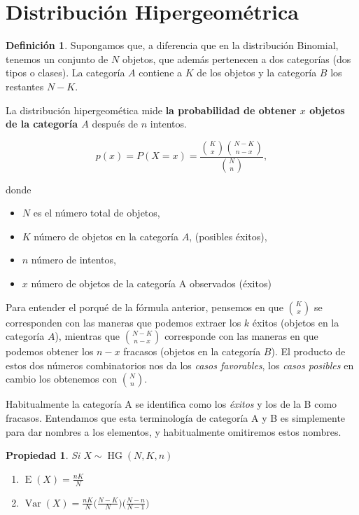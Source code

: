 \documentclass[]{book}
\providecommand{\tightlist}{%
  \setlength{\itemsep}{0pt}\setlength{\parskip}{0pt}}
\theoremstyle{plain}
\newtheorem{property}[theorem]{Propiedad}
\theoremstyle{definition}
\newtheorem{definition}[theorem]{Definición}
\theoremstyle{definition} %
\begin{document}
\section{Distribución Hipergeométrica} 

\begin{definition}
  Supongamos que, a diferencia que en la distribución Binomial, tenemos un
conjunto de \(N\) objetos, que además pertenecen a dos categorías (dos
tipos o clases). La categoría \(A\) contiene a \(K\) de los objetos y la
categoría \(B\) los restantes \(N-K\).

La distribución hipergeomética mide \textbf{la probabilidad de obtener
\(x\) objetos de la categoría \(A\)} después de \(n\) intentos.

\[\displaystyle p(x)=P(X=x)={\frac {{\binom {K}{x}}{\binom {N-K}{n-x}}}{\binom {N}{n}}},\]

donde

\begin{itemize}
\tightlist
\item
  \(N\) es el número total de objetos,
\item
  \(K\) número de objetos en la categoría \(A\), (posibles éxitos),
\item
  \(n\) número de intentos,
\item
  \(x\) número de objetos de la categoría A observados (éxitos)
\end{itemize}

Para entender el porqué de la fórmula anterior, pensemos en que
\({\binom {K}{x}}\) se corresponden con las maneras que podemos extraer
los \(k\) éxitos (objetos en la categoría \(A\)), mientras que
\({\binom {N-K}{n-x}}\) corresponde con las maneras en que podemos
obtener los \(n-x\) fracasos (objetos en la categoría \(B\)). El
producto de estos dos números combinatorios nos da los \emph{casos
favorables}, los \emph{casos posibles} en cambio los obtenemos con
\({\binom {N}{n}}\).

Habitualmente la categoría A se identifica como los \emph{éxitos} y los de la B como fracasos. 
Entendamos que esta terminología de categoría A y B es simplemente para dar nombres a los elementos, y habitualmente omitiremos 
estos nombres.

\end{definition}
 

\begin{property}

  Si \(\displaystyle X\sim \operatorname {HG} (N,K,n)\)  
\begin{enumerate}
  \item $\displaystyle \operatorname {E} (X)={\frac {nK}{N}}$
  \item $\displaystyle \operatorname {Var} (X)={\frac {nK}{N}}{\bigg (}{\frac {N-K}{N}}{\bigg )}{\bigg (}{\frac {N-n}{N-1}}{\bigg )}$
\end{enumerate}
\end{property}
 
\end{document}
